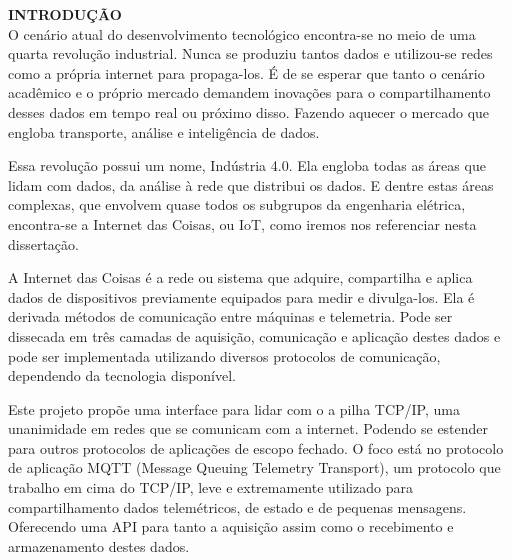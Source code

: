 \noindent\textbf{INTRODUÇÃO}
$\!$\\

O cenário atual do desenvolvimento tecnológico encontra-se no meio de uma quarta revolução industrial. Nunca se produziu tantos dados e utilizou-se redes como a própria internet para propaga-los. É de se esperar que tanto o cenário acadêmico e o próprio mercado demandem inovações para o compartilhamento desses dados em tempo real ou próximo disso. Fazendo aquecer o mercado que engloba transporte, análise e inteligência de dados.

Essa revolução possui um nome, Indústria 4.0. Ela engloba todas as áreas que lidam com dados, da análise à rede que distribui os dados. E dentre estas áreas complexas, que envolvem quase todos os subgrupos da engenharia elétrica, encontra-se a Internet das Coisas, ou IoT, como iremos nos referenciar nesta dissertação.

A Internet das Coisas é a rede ou sistema que adquire, compartilha e aplica dados de dispositivos previamente equipados para medir e divulga-los. Ela é derivada métodos de comunicação entre máquinas e telemetria. Pode ser dissecada em três camadas de aquisição, comunicação e aplicação destes dados e pode ser implementada utilizando diversos protocolos de comunicação, dependendo da tecnologia disponível.

Este projeto propõe uma interface para lidar com o a pilha TCP/IP, uma unanimidade em redes que se comunicam com a internet. Podendo se estender para outros protocolos de aplicações de escopo fechado. O foco está no protocolo de aplicação MQTT (Message Queuing Telemetry Transport), um protocolo que trabalho em cima do TCP/IP, leve e extremamente utilizado para compartilhamento dados telemétricos, de estado e de pequenas mensagens. Oferecendo uma API para tanto a aquisição assim como o recebimento e armazenamento destes dados.

 